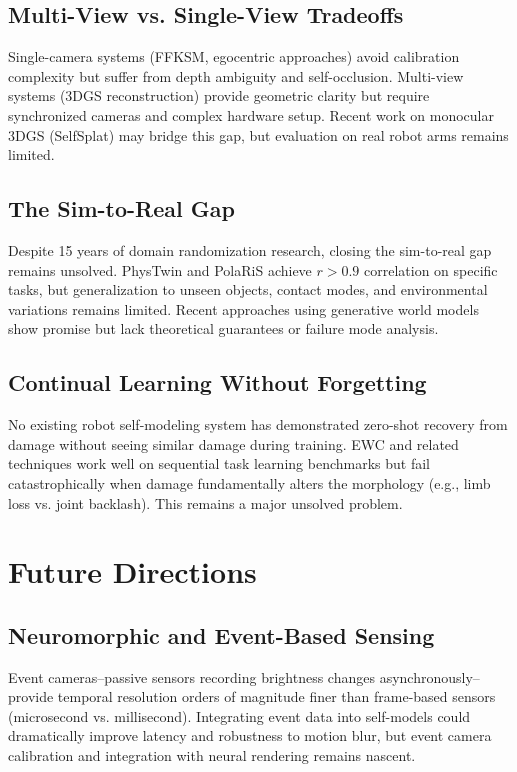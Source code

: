 \documentclass[journal]{IEEEtran}
\begin{document}
\subsection{Multi-View vs. Single-View Tradeoffs}

Single-camera systems (FFKSM, egocentric approaches) avoid calibration complexity but suffer from depth ambiguity and self-occlusion. Multi-view systems (3DGS reconstruction) provide geometric clarity but require synchronized cameras and complex hardware setup. Recent work on monocular 3DGS (SelfSplat) may bridge this gap, but evaluation on real robot arms remains limited.

\subsection{The Sim-to-Real Gap}

Despite 15 years of domain randomization research, closing the sim-to-real gap remains unsolved. PhysTwin and PolaRiS achieve $r > 0.9$ correlation on specific tasks, but generalization to unseen objects, contact modes, and environmental variations remains limited. Recent approaches using generative world models show promise but lack theoretical guarantees or failure mode analysis.

\subsection{Continual Learning Without Forgetting}

No existing robot self-modeling system has demonstrated zero-shot recovery from damage without seeing similar damage during training. EWC and related techniques work well on sequential task learning benchmarks but fail catastrophically when damage fundamentally alters the morphology (e.g., limb loss vs. joint backlash). This remains a major unsolved problem.

\section{Future Directions}

\subsection{Neuromorphic and Event-Based Sensing}

Event cameras--passive sensors recording brightness changes asynchronously--provide temporal resolution orders of magnitude finer than frame-based sensors (microsecond vs. millisecond). Integrating event data into self-models could dramatically improve latency and robustness to motion blur, but event camera calibration and integration with neural rendering remains nascent.
\end{document}
